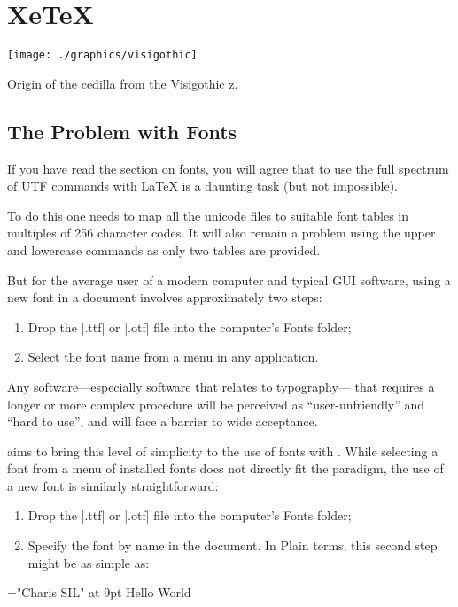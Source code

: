 \chapter{XeTeX}

 \captionsetup[figure]{margin=10pt,font=small,labelfont=bf}  

\begin{marginfigure}%
  \texttt{[image: ./graphics/visigothic]}
  \captionsetup[figure]{margin=10pt,font=small,labelfont=bf}  
  \caption{Origin of the cedilla from the Visigothic z. }
  \label{fig:visigothic}
\end{marginfigure}

\section{The Problem with Fonts}

If you have read the section on fonts, you will agree that to use
the full spectrum of UTF commands with LaTeX is a daunting task (but not impossible).

To do this one needs to map all the unicode files to suitable font tables in multiples
of 256 character codes. It will also remain a problem using the upper and lowercase commands
as only two tables are provided.

But for the average user of a modern  computer
and typical GUI software, using a new font in a document
involves approximately two steps:


\begin{enumerate}

\item Drop the |.ttf| or |.otf| file into the computer’s Fonts
folder;

\item Select the font name from a menu in any application.
\end{enumerate}

Any software—especially software that relates to typography—
that requires a longer or more complex procedure
will be perceived as ``user-unfriendly'' and ``hard to use'',
and will face a barrier to wide acceptance. 

\xetex aims to bring this level of simplicity to the use
of fonts with \tex. While selecting a font from a menu of
installed fonts does not directly fit the \tex paradigm, the
use of a new font is similarly straightforward:

\begin{enumerate}
\item Drop the |.ttf| or |.otf| file into the computer’s Fonts
folder;
\item Specify the font by name in the \tex document.
In Plain \tex terms, this second step might be as simple as:
\end{enumerate}

\begin{teX}
\font\myfont="Charis SIL"  at 9pt
\myfont Hello World
\end{teX}